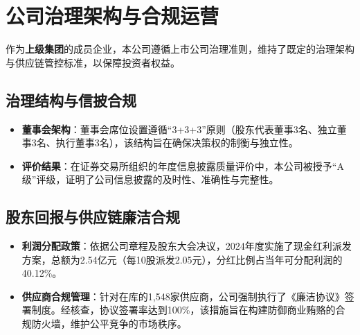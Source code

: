 \documentclass[a4paper,12pt]{article}
\begin{document}
\section{公司治理架构与合规运营}

作为\textbf{上级集团}的成员企业，本公司遵循上市公司治理准则，维持了既定的治理架构与供应链管控标准，以保障投资者权益。

\subsection{治理结构与信披合规}

\begin{itemize}
    \item \textbf{董事会架构}：董事会席位设置遵循“3+3+3”原则（股东代表董事3名、独立董事3名、执行董事3名），该结构旨在确保决策权的制衡与独立性。
    \item \textbf{评价结果}：在证券交易所组织的年度信息披露质量评价中，本公司被授予“A级”评级，证明了公司信息披露的及时性、准确性与完整性。
\end{itemize}

\subsection{股东回报与供应链廉洁合规}

\begin{itemize}
    \item \textbf{利润分配政策}：依据公司章程及股东大会决议，2024年度实施了现金红利派发方案，总额为2.54亿元（每10股派发2.05元），分红比例占当年可分配利润的40.12\%。
    \item \textbf{供应商合规管理}：针对在库的1,548家供应商，公司强制执行了《廉洁协议》签署制度。经核查，协议签署率达到100\%，该措施旨在构建防御商业贿赂的合规防火墙，维护公平竞争的市场秩序。
\end{itemize}
\end{document}
